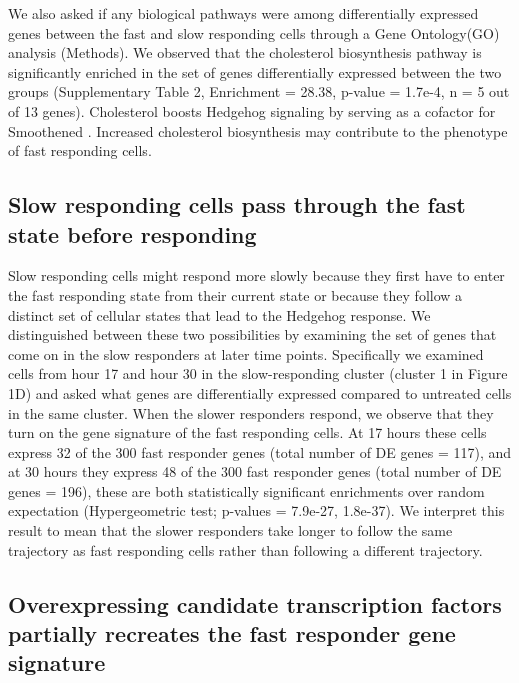 We also asked if any biological pathways were among differentially expressed genes between the fast and slow responding cells through a Gene Ontology(GO) analysis (Methods). We observed that the cholesterol biosynthesis pathway is significantly enriched in the set of genes differentially expressed between the two groups (Supplementary Table 2, Enrichment = 28.38, p-value = 1.7e-4, n = 5 out of 13 genes). Cholesterol boosts Hedgehog signaling by serving as a cofactor for Smoothened \cite{Huang2018-iz,Huang2016-er,Kinnebrew2019-gt,Luchetti2016-cd,Radhakrishnan2020-ii}. Increased cholesterol biosynthesis may contribute to the phenotype of fast responding cells. 


\subsection{Slow responding cells pass through the fast state before responding}

Slow responding cells might respond more slowly because they first have to enter the fast responding state from their current state or because they follow a distinct set of cellular states that lead to the Hedgehog response. We distinguished between these two possibilities by examining the set of genes that come on in the slow responders at later time points. Specifically we examined cells from hour 17 and hour 30 in the slow-responding cluster (cluster 1 in Figure 1D) and asked what genes are differentially expressed compared to untreated cells in the same cluster. When the slower responders respond, we observe that they turn on the gene signature of the fast responding cells. At 17 hours these cells express 32 of the 300 fast responder genes (total number of DE genes = 117), and at 30 hours they express 48 of the 300 fast responder genes (total number of DE genes = 196), these are both statistically significant enrichments over random expectation (Hypergeometric test; p-values = 7.9e-27, 1.8e-37). We interpret this result to mean that the slower responders take longer to follow the same trajectory as fast responding cells rather than following a different trajectory.

\subsection{Overexpressing candidate transcription factors partially recreates the fast responder gene signature}

